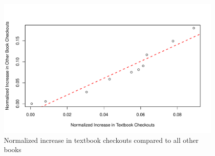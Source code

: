 \documentclass[10pt]{article}\usepackage[]{graphicx}\usepackage[]{xcolor}
\makeatletter
\def\maxwidth{ %
  \ifdim\Gin@nat@width>\linewidth
    \linewidth
  \else
    \Gin@nat@width
  \fi
}
\newenvironment{knitrout}{}{} %
\makeatother
\begin{document}
\begin{figure}[H]
\begin{center}
\begin{knitrout}
\color{fgcolor}
\includegraphics[width=\maxwidth]{figure/plot5-1} 
\end{knitrout}
\end{center}
\caption{Normalized increase in textbook checkouts compared to all other books}\label{fig:5}
\end{figure}
\end{document}
